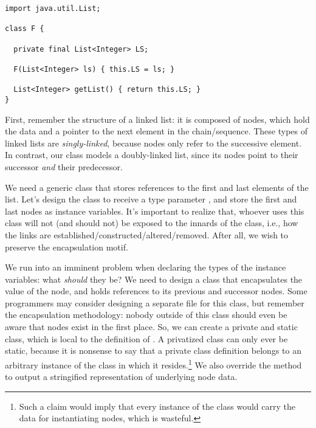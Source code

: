 \begin{lstlisting}[language=MyJava]
import java.util.List;

class F {
  
  private final List<Integer> LS;
  
  F(List<Integer> ls) { this.LS = ls; }
  
  List<Integer> getList() { return this.LS; }
}
\end{lstlisting}


First, remember the structure of a linked list: it is composed of nodes, which hold the data and a pointer to the next element in the chain/sequence. These types of linked lists are \emph{singly-linked}, because nodes only refer to the successive element. In contrast, our class models a doubly-linked list, since its nodes point to their successor \emph{and} their predecessor. 

We need a generic class that stores references to the first and last elements of the list. Let's design the  class to receive a type parameter , and store the first and last nodes as instance variables. It's important to realize that, whoever uses this class will not (and should not) be exposed to the innards of the class, i.e., how the links are established/constructed/altered/removed. After all, we wish to preserve the encapsulation motif.

We run into an imminent problem when declaring the types of the instance variables: what \emph{should} they be? 
We need to design a class that encapsulates the value of the node, and holds references to its previous and successor nodes. 
Some programmers may consider designing a separate  file for this class, but remember the encapsulation methodology: nobody outside of this class should even be aware that nodes exist in the first place. 
So, we can create a private and static  class, which is local to the definition of . 
A privatized class can only ever be static, because it is nonsense to say that a private class definition belongs to an arbitrary instance of the class in which it resides.\footnote{Such a claim would imply that every instance of the  class would carry the data for instantiating nodes, which is wasteful.} 
We also override the  method to output a stringified representation of underlying node data.

